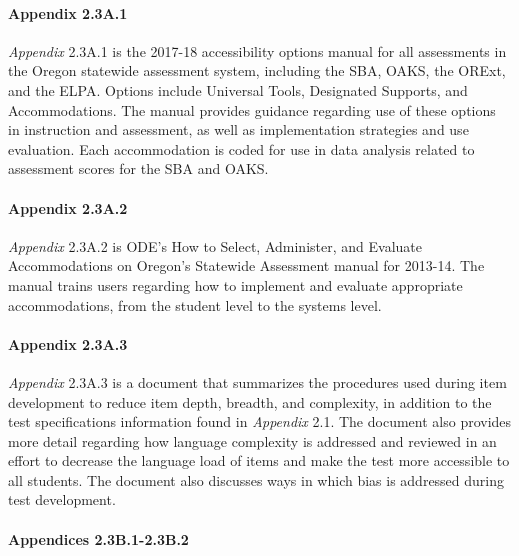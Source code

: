 \documentclass[]{article}
\let\oldparagraph\paragraph
\renewcommand{\paragraph}[1]{\oldparagraph{#1}\mbox{}}
\begin{document}
\paragraph{Appendix 2.3A.1}\label{appendix-2.3a.1}

\emph{Appendix} 2.3A.1 is the 2017-18 accessibility options manual for
all assessments in the Oregon statewide assessment system, including the
SBA, OAKS, the ORExt, and the ELPA. Options include Universal Tools,
Designated Supports, and Accommodations. The manual provides guidance
regarding use of these options in instruction and assessment, as well as
implementation strategies and use evaluation. Each accommodation is
coded for use in data analysis related to assessment scores for the SBA
and OAKS.

\paragraph{Appendix 2.3A.2}\label{appendix-2.3a.2}

\emph{Appendix} 2.3A.2 is ODE's How to Select, Administer, and Evaluate
Accommodations on Oregon's Statewide Assessment manual for 2013-14. The
manual trains users regarding how to implement and evaluate appropriate
accommodations, from the student level to the systems level.

\paragraph{Appendix 2.3A.3}\label{appendix-2.3a.3}

\emph{Appendix} 2.3A.3 is a document that summarizes the procedures used
during item development to reduce item depth, breadth, and complexity,
in addition to the test specifications information found in
\emph{Appendix} 2.1. The document also provides more detail regarding
how language complexity is addressed and reviewed in an effort to
decrease the language load of items and make the test more accessible to
all students. The document also discusses ways in which bias is
addressed during test development.

\paragraph{Appendices 2.3B.1-2.3B.2}\label{appendices-2.3b.1-2.3b.2}
\end{document}
